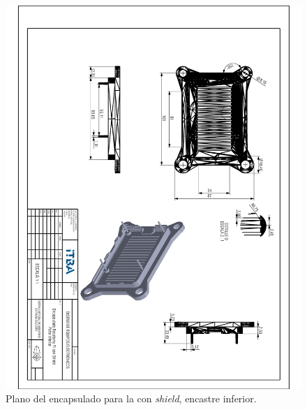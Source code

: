 \begin{figure}[H]
	\centering
	\includegraphics[width=\linewidth]{ImagenesApendice/RpiCasingBottom}
	\caption{Plano del encapsulado para la \rspi con \textit{shield}, encastre inferior.}
	\label{fig:RpiCasingBottom}
\end{figure}

